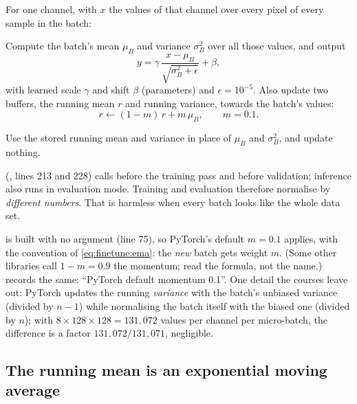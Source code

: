 For one channel, with $x$ the values of that channel over every pixel of every sample in the batch:
\begin{description}[style=nextline,leftmargin=1.2em]
  \item[Training mode (\texttt{model.train()})] Compute the batch's mean $\mu_B$ and variance $\sigma_B^2$ over all those values, and output
    \begin{equation}\label{eq:finetune:bntrain}
      y = \gamma\,\frac{x - \mu_B}{\sqrt{\sigma_B^2 + \epsilon}} + \beta,
    \end{equation}
    with learned scale $\gamma$ and shift $\beta$ (parameters) and $\epsilon = 10^{-5}$. Also update two buffers, the running mean $r$ and running
    variance, towards the batch's values:
    \begin{equation}\label{eq:finetune:ema}
      r \leftarrow (1 - m)\,r + m\,\mu_B, \qquad m = 0.1.
    \end{equation}
  \item[Evaluation mode (\texttt{model.eval()})] Use the stored running mean and variance in place of $\mu_B$ and $\sigma_B^2$, and update nothing.
\end{description}
 (, lines 213 and 228) calls  before the
training pass and  before validation; inference also runs in evaluation mode. Training and evaluation therefore normalise by
\emph{different numbers}. That is harmless when every batch looks like the whole data set.

\begin{sourcenote}
 is built with no  argument (line 75), so PyTorch's default $m = 0.1$ applies, with the convention of
\eqref{eq:finetune:ema}: the \emph{new} batch gets weight $m$. (Some other libraries call $1 - m = 0.9$ the momentum; read the formula, not the name.)
 records the same: ``PyTorch default momentum 0.1''. One detail the courses leave out: PyTorch updates the running
\emph{variance} with the batch's unbiased variance (divided by $n - 1$) while normalising the batch itself with the biased one (divided by $n$); with
$8 \times 128 \times 128 = 131{,}072$ values per channel per micro-batch, the difference is a factor $131{,}072/131{,}071$, negligible.
\end{sourcenote}

\subsection{The running mean is an exponential moving average}

